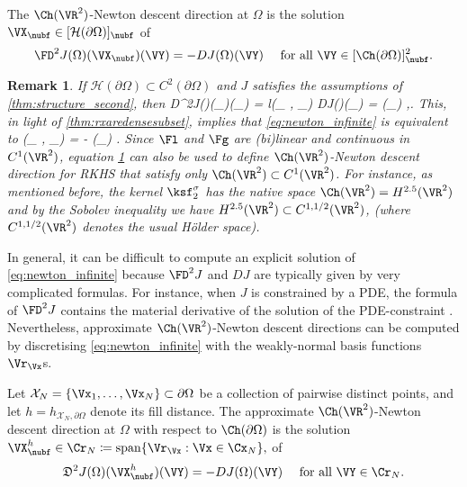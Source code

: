 \documentclass{siamart1116}
\newtheorem{remark}[theorem]{Remark}
\numberwithin{theorem}{section}
\begin{document}
\begin{definition}
The $\Ch(\VR^2)$-Newton descent direction at $\Omega$ is the solution
$\VX_{\nubf}\in [\mathcal H(\partial \Omega)]_{\nubf}$ of
 \begin{equation}\label{eq:newton_infinite}
 \FD^2J(\Omega)(\VX_{\nubf})(\VY) = - DJ(\Omega)(\VY) \quad \text{ for all } \VY\in [\Ch(\partial \Omega)]^2_{\nubf}.
 \end{equation}
\end{definition}
 
\begin{remark}
If $\mathcal H(\partial \Omega)\subset C^2(\partial \Omega)$ and
$J$ satisfies the assumptions of \cref{thm:structure_second}, then
\ben
\mathfrak D^2J(\Omega)(\Vr_\Vx)(\Vr_\Vy) = \mathfrak l(\Vr_\Vx\cdot 
\nubf, \Vr_\Vy\cdot \nubf)
\quad {} \quad 
DJ(\Omega)(\Vr_\Vy)  = \Fg(\Vr_\Vy\cdot \nubf)
\quad {} \quad\Vx,\Vy\in \partial \Omega. 
\een
This, in light of \cref{thm:rxaredensesubset}, implies that \cref{eq:newton_infinite} is equivalent to
\ben\label{eq:NewtonBdry}
\Fl(\VX_{\nubf}\cdot 
\nubf, \Vr_\Vy\cdot \nubf) = - \Fg(\Vr_\Vy\cdot \nubf) \quad {} \quad\Vy\in \partial \Omega. 
\een
Since $\Fl$ and $\Fg$ are (bi)linear and continuous in $C^1(\VR^2)$, equation \cref{eq:NewtonBdry}
can also be used to define $\Ch(\VR^2)$-Newton descent direction for RKHS that satisfy only
$\Ch(\VR^2)\subset C^1(\VR^2)$. For instance, as mentioned before, the kernel $\ksf_2^\sigma$ has the native space
$\Ch (\VR^2) = H^{2.5}(\VR^2)$ and by the Sobolev inequality we have $H^{2.5}(\VR^2) \subset C^{1,1/2}(\VR^2)$, (where 
$C^{1,1/2}(\VR^2)$ denotes the usual H\"older space). 
\end{remark}

In general, it can be difficult to compute an explicit solution of \cref{eq:newton_infinite}
because $\FD^2J$ and $DJ$ are typically given by very complicated formulas. For instance,
when $J$ is constrained by a PDE, the formula of $\FD^2J$
contains the material derivative of the solution of the PDE-constraint \cite{DeZo91}.
Nevertheless, approximate $\Ch(\VR^2)$-Newton descent directions can be computed
by discretising \cref{eq:newton_infinite} with the weakly-normal basis functions $\Vr_\Vx$s.

\begin{definition}
Let $\mathcal X_N=\{\Vx_1,\ldots, \Vx_N\}\subset \partial \Omega$
be a collection of pairwise distinct points, and let
$h = h_{\mathcal X_N,\partial \Omega}$ denote its fill distance.
The approximate $\Ch(\VR^2)$-Newton descent direction at $\Omega$ with respect to $\Ch(\partial \Omega)$
is the solution $\VX_{\nubf}^h\in \Cr_N\coloneqq\mathrm{span}\{\Vr_{\Vx}: \Vx \in \Cx_N\},$ of
\begin{equation}\label{eq:newton_discrete}
\mathfrak D^2J(\Omega)(\VX_{\nubf}^h)(\VY) = - DJ(\Omega)(\VY) \quad \text{ for all } \VY \in \Cr_N.
\end{equation}
\end{definition}
\end{document}
